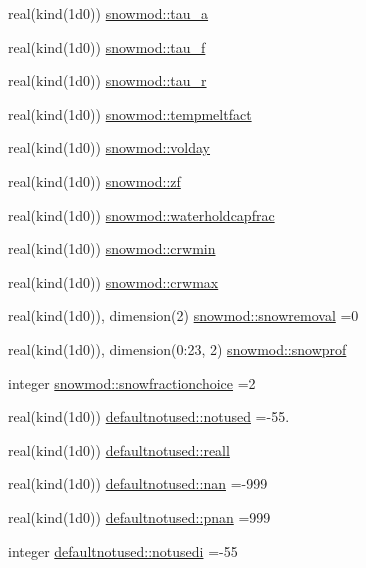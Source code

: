 \begin{DoxyCompactItemize}
\item 
real(kind(1d0)) \hyperlink{namespacesnowmod_a98e11e8fda25e951b1c7a65ec1d36e9f}{snowmod\+::tau\+\_\+a}
\item 
real(kind(1d0)) \hyperlink{namespacesnowmod_adcf5755398c1385d35ef29e6f780ff9c}{snowmod\+::tau\+\_\+f}
\item 
real(kind(1d0)) \hyperlink{namespacesnowmod_aaf08f7c00b0d87b2135341ca3f63f0d7}{snowmod\+::tau\+\_\+r}
\item 
real(kind(1d0)) \hyperlink{namespacesnowmod_a963e4ef23aef666f3afb12096ef952b8}{snowmod\+::tempmeltfact}
\item 
real(kind(1d0)) \hyperlink{namespacesnowmod_aef00a57fa640ad627fb60de11644e20d}{snowmod\+::volday}
\item 
real(kind(1d0)) \hyperlink{namespacesnowmod_ab1cf232aa719c4c447ac11c210889e66}{snowmod\+::zf}
\item 
real(kind(1d0)) \hyperlink{namespacesnowmod_a8cda7b30a924d03ee30f2bde6c9e41bc}{snowmod\+::waterholdcapfrac}
\item 
real(kind(1d0)) \hyperlink{namespacesnowmod_ab2e9b89164bc8dd89eadb546e3ef57fa}{snowmod\+::crwmin}
\item 
real(kind(1d0)) \hyperlink{namespacesnowmod_adec694ca0cbc2092f2c5d16238b4d0a9}{snowmod\+::crwmax}
\item 
real(kind(1d0)), dimension(2) \hyperlink{namespacesnowmod_a9c7d574d109596d16542b38123065e66}{snowmod\+::snowremoval} =0
\item 
real(kind(1d0)), dimension(0\+:23, 2) \hyperlink{namespacesnowmod_a1c6363fdf19c43957a62d24fa22ea25e}{snowmod\+::snowprof}
\item 
integer \hyperlink{namespacesnowmod_afb1d5c1c466c1cb87fcf8548322581a1}{snowmod\+::snowfractionchoice} =2
\item 
real(kind(1d0)) \hyperlink{namespacedefaultnotused_a71e2d536a1c83e98103c3ed183c303cd}{defaultnotused\+::notused} =-\/55.
\item 
real(kind(1d0)) \hyperlink{namespacedefaultnotused_acc4adc83f26d421a6b79e44ae8a57896}{defaultnotused\+::reall}
\item 
real(kind(1d0)) \hyperlink{namespacedefaultnotused_a9ad6683bfdf839485292f0be53501f07}{defaultnotused\+::nan} =-\/999
\item 
real(kind(1d0)) \hyperlink{namespacedefaultnotused_abe169835df07a0da3ef05d9386ac49e8}{defaultnotused\+::pnan} =999
\item 
integer \hyperlink{namespacedefaultnotused_afd5393d7b0bd5eadd9ebcf66bd974e0d}{defaultnotused\+::notusedi} =-\/55

\end{DoxyCompactItemize}
